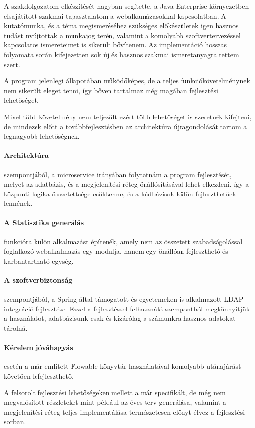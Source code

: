 
A szakdolgozatom elkészítését nagyban segítette, a Java Enterprise környezetben elsajátított szakmai tapasztalatom a webalkamázasokkal kapcsolatban. A kutatómunka, és a téma megismeréséhez szükséges előkészületek igen hasznos tudást nyújtottak a munkajog terén, valamint a komolyabb szoftvertervezéssel kapcsolatos ismereteimet is sikerült bővítenem. Az implementáció hosszas folyamata során kifejezetten sok új és hasznos szakmai ismeretanyagra tettem szert.

A program jelenlegi állapotában működőképes, de a teljes funkciókövetelménynek nem sikerült eleget tenni, így bőven tartalmaz még magában fejlesztési lehetőséget.


Mivel több követelmény nem teljesült ezért több lehetőséget is szeretnék kifejteni, de mindezek előtt a továbbfejlesztésben az architektúra újragondolását tartom a legnagyobb lehetőségnek.
\paragraph{Architektúra} szempontjából, a microservice irányában folytatnám a program fejlesztését, melyet az adatbázis, és a megjelenítési réteg önállósításával lehet elkezdeni. így a központi logika összetettsége csökkenne, és a kódbázisok külön fejleszthetőek lennének.

\paragraph{A Statisztika generálás} funkcióra külön alkalmazást építenék, amely nem az összetett szabadságolással foglalkozó webalkalmazás egy modulja, hanem egy önállóan fejleszthető és karbantartható egység.

\paragraph{A szoftverbiztonság} szempontjából, a Spring által támogatott és egyetemeken is alkalmazott LDAP integráció fejlesztése. Ezzel a fejlesztéssel felhasználó szempontból megkönnyítjük a használatot, adatbázisunk csak és kizárólag a számunkra hasznos adatokat tárolná.

\paragraph{Kérelem jóváhagyás} esetén a már említett Flowable könyvtár használatával komolyabb utánajárást követően lefejleszthető.

A felsorolt fejlesztési lehetőségeken mellett a már specifikált, de még nem megvalósított részleteket mint például az éves terv generálása, valamint a megjelenítési réteg teljes implementálása természetesen előnyt élvez a fejlesztési sorban.

